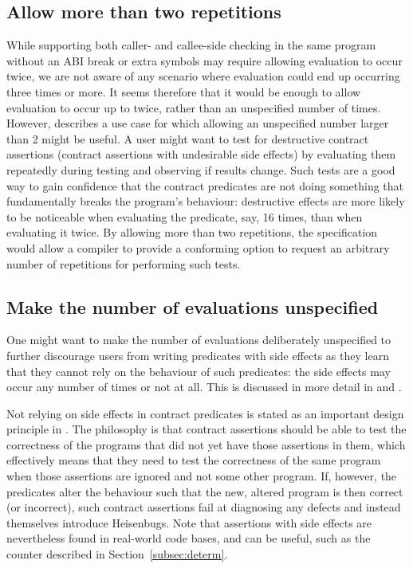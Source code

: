 \subsection{Allow more than two repetitions}
\label{subsec:rep}

While supporting both caller- and callee-side checking in the same program without an ABI break or extra symbols may require allowing evaluation to occur twice, we are not aware of any scenario where evaluation could end up occurring three times or more. It seems therefore that it would be enough to allow evaluation to occur up to twice, rather than an unspecified number of times. However, \cite{P3119R0} describes a use case for which allowing an unspecified number larger than 2 might be useful. A user might want to test for destructive contract assertions (contract assertions with undesirable side effects) by evaluating them repeatedly during testing and observing if results change.  Such tests are a good way to gain confidence that the contract predicates are not doing something that fundamentally breaks the program's behaviour: destructive effects are more likely to be noticeable when evaluating the predicate, say, 16 times, than when evaluating it twice. By allowing more than two repetitions, the specification would allow a compiler to provide a conforming option to request an arbitrary number of repetitions for performing such tests.

\subsection{Make the number of evaluations unspecified}
\label{subsec:discourage}

One might want to make the number of evaluations deliberately unspecified to further discourage users from writing predicates with side effects as they learn that they cannot rely on the behaviour of such predicates: the side effects may occur any number of times or not at all. This is discussed in more detail in \cite{P1670R0} and \cite{P2751R1}.

Not relying on side effects in contract predicates is stated as an important design principle in \cite{P2900R6}. The philosophy is that contract assertions should be able to test the correctness of the programs that did not yet have those assertions in them, which effectively means that they need to test the correctness of the same program when those assertions are ignored and not some other program. If, however, the predicates alter the behaviour such that the new, altered program is then correct (or incorrect), such contract assertions fail at diagnosing any defects and instead themselves introduce Heisenbugs. Note that assertions with side effects are nevertheless found in real-world code bases, and can be useful, such as the counter described in Section~\ref{subsec:determ}.


